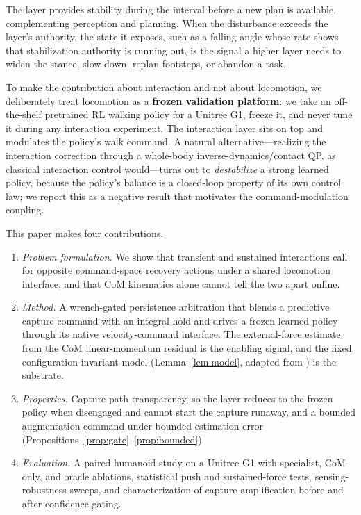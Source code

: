 \documentclass[journal]{IEEEtran}
\begin{document}
The layer provides stability during the interval before a new plan is available, complementing perception and planning. When the disturbance exceeds the layer's authority, the state it exposes, such as a falling angle whose rate shows that stabilization authority is running out, is the signal a higher layer needs to widen the stance, slow down, replan footsteps, or abandon a task.

To make the contribution about interaction and not about locomotion, we deliberately treat 
locomotion as a \textbf{frozen validation platform}: we take an off-the-shelf pretrained RL
walking policy \cite{r16} for a Unitree G1, freeze it, and never tune it during any interaction experiment.
The interaction layer sits on top and modulates the policy's walk command. A natural 
alternative---realizing the interaction correction through a whole-body inverse-dynamics/contact QP, 
as classical interaction control would---turns out to \emph{destabilize} a strong learned policy, 
because the policy's balance is a closed-loop property of its own control law; we report this as a 
negative result that motivates the command-modulation coupling.

This paper makes four contributions.
\begin{enumerate}
\item \emph{Problem formulation.} We show that transient and sustained interactions call for opposite command-space recovery actions under a shared locomotion interface, and that CoM kinematics alone cannot tell the two apart online.
\item \emph{Method.} A wrench-gated persistence arbitration that blends a predictive capture command with an integral hold and drives a frozen learned policy through its native velocity-command interface. The external-force estimate from the CoM linear-momentum residual is the enabling signal, and the fixed configuration-invariant model (Lemma~\ref{lem:model}, adapted from \cite{r1}) is the substrate.
\item \emph{Properties.} Capture-path transparency, so the layer reduces to the frozen policy when disengaged and cannot start the capture runaway, and a bounded augmentation command under bounded estimation error (Propositions~\ref{prop:gate}--\ref{prop:bounded}).
\item \emph{Evaluation.} A paired humanoid study on a Unitree G1 with specialist, CoM-only, and oracle ablations, statistical push and sustained-force tests, sensing-robustness sweeps, and characterization of capture amplification before and after confidence gating.
\end{enumerate}
\end{document}
